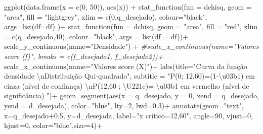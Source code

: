 \documentclass[
]{book}
\newenvironment{Shaded}{\begin{snugshade}}{\end{snugshade}}
\newcommand{\AttributeTok}[1]{\textcolor[rgb]{0.77,0.63,0.00}{#1}}
\newcommand{\CommentTok}[1]{\textcolor[rgb]{0.56,0.35,0.01}{\textit{#1}}}
\newcommand{\DecValTok}[1]{\textcolor[rgb]{0.00,0.00,0.81}{#1}}
\newcommand{\FloatTok}[1]{\textcolor[rgb]{0.00,0.00,0.81}{#1}}
\newcommand{\FunctionTok}[1]{\textcolor[rgb]{0.00,0.00,0.00}{#1}}
\newcommand{\NormalTok}[1]{#1}
\newcommand{\SpecialCharTok}[1]{\textcolor[rgb]{0.00,0.00,0.00}{#1}}
\newcommand{\StringTok}[1]{\textcolor[rgb]{0.31,0.60,0.02}{#1}}
\begin{document}
\begin{Shaded}
\begin{Highlighting}[]
\FunctionTok{ggplot}\NormalTok{(}\FunctionTok{data.frame}\NormalTok{(}\AttributeTok{x =} \FunctionTok{c}\NormalTok{(}\DecValTok{0}\NormalTok{, }\DecValTok{50}\NormalTok{)), }\FunctionTok{aes}\NormalTok{(x)) }\SpecialCharTok{+}
  \FunctionTok{stat\_function}\NormalTok{(}\AttributeTok{fun =}\NormalTok{ dchisq,}
                \AttributeTok{geom =} \StringTok{"area"}\NormalTok{,}
                \AttributeTok{fill =} \StringTok{"lightgrey"}\NormalTok{,}
                \AttributeTok{xlim =} \FunctionTok{c}\NormalTok{(}\DecValTok{0}\NormalTok{,q\_desejado),}
                \AttributeTok{colour=}\StringTok{"black"}\NormalTok{,}
                \AttributeTok{args=}\FunctionTok{list}\NormalTok{(}\AttributeTok{df=}\NormalTok{df) )}\SpecialCharTok{+}
  \FunctionTok{stat\_function}\NormalTok{(}\AttributeTok{fun =}\NormalTok{ dchisq,}
                \AttributeTok{geom =} \StringTok{"area"}\NormalTok{,}
                \AttributeTok{fill =} \StringTok{"red"}\NormalTok{,}
                \AttributeTok{xlim =} \FunctionTok{c}\NormalTok{(q\_desejado,}\DecValTok{40}\NormalTok{),}
                \AttributeTok{colour=}\StringTok{"black"}\NormalTok{,}
                \AttributeTok{args =} \FunctionTok{list}\NormalTok{(}\AttributeTok{df =}\NormalTok{ df))}\SpecialCharTok{+}
  \FunctionTok{scale\_y\_continuous}\NormalTok{(}\AttributeTok{name=}\StringTok{"Densidade"}\NormalTok{) }\SpecialCharTok{+}
  \CommentTok{\#scale\_x\_continuous(name="Valores score (f)", breaks = c(f\_desejado1, f\_desejado2))+  }
  \FunctionTok{scale\_x\_continuous}\NormalTok{(}\AttributeTok{name=}\StringTok{"Valores score (X)"}\NormalTok{)}\SpecialCharTok{+}  
  \FunctionTok{labs}\NormalTok{(}\AttributeTok{title=}\StringTok{"Curva da função densidade }\SpecialCharTok{\textbackslash{}n}\StringTok{Distribuição Qui{-}quadrado"}\NormalTok{, }
  \AttributeTok{subtitle =} \StringTok{"P(0; 12,60)=(1{-}\textbackslash{}u03b1) em cinza (nível de confiança) }\SpecialCharTok{\textbackslash{}n}\StringTok{P(12,60 ; \textbackslash{}U221e)= \textbackslash{}u03b1 em vermelho (nível de significância) "}\NormalTok{)}\SpecialCharTok{+}
  \FunctionTok{geom\_segment}\NormalTok{(}\FunctionTok{aes}\NormalTok{(}\AttributeTok{x =}\NormalTok{ q\_desejado, }\AttributeTok{y =} \DecValTok{0}\NormalTok{, }\AttributeTok{xend =}\NormalTok{ q\_desejado, }\AttributeTok{yend =}\NormalTok{ d\_desejada), }\AttributeTok{color=}\StringTok{"blue"}\NormalTok{, }\AttributeTok{lty=}\DecValTok{2}\NormalTok{, }\AttributeTok{lwd=}\FloatTok{0.3}\NormalTok{)}\SpecialCharTok{+}
  \FunctionTok{annotate}\NormalTok{(}\AttributeTok{geom=}\StringTok{"text"}\NormalTok{, }\AttributeTok{x=}\NormalTok{q\_desejado}\FloatTok{+0.5}\NormalTok{, }\AttributeTok{y=}\NormalTok{d\_desejada, }\AttributeTok{label=}\StringTok{"x crítico=12,60"}\NormalTok{, }\AttributeTok{angle=}\DecValTok{90}\NormalTok{, }\AttributeTok{vjust=}\DecValTok{0}\NormalTok{, }\AttributeTok{hjust=}\DecValTok{0}\NormalTok{, }\AttributeTok{color=}\StringTok{"blue"}\NormalTok{,}\AttributeTok{size=}\DecValTok{4}\NormalTok{)}\SpecialCharTok{+}

\end{Highlighting}
\end{Shaded}
\end{document}
